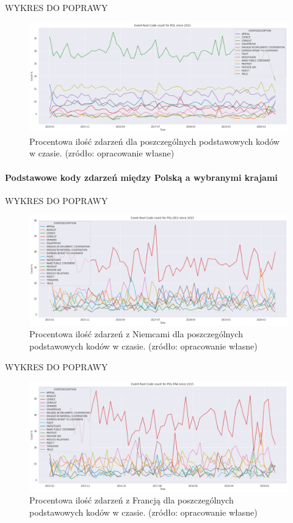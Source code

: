 \documentclass[11pt]{report}
\begin{document}
    WYKRES DO POPRAWY
    \begin{figure}[ht]
        \centering
        \includegraphics[width=1 \textwidth]{fig/PL/PLERCpercinTIME.png}
        \caption{Procentowa ilość zdarzeń dla poszczególnych podstawowych kodów w czasie. (zródło: opracowanie własne)}
        \label{fig:PLPERCpercinTIME}
    \end{figure}

    \paragraph{Podstawowe kody zdarzeń między Polską a wybranymi krajami}
    WYKRES DO POPRAWY
    \begin{figure}[ht]
        \centering
        \includegraphics[width=1 \textwidth]{fig/PL/POLDEUERCperc.png}
        \caption{Procentowa ilość zdarzeń z Niemcami dla poszczególnych podstawowych kodów w czasie. (zródło: opracowanie własne)}
        \label{fig:PLDEUERC}
    \end{figure}

    WYKRES DO POPRAWY
    \begin{figure}[ht]
        \centering
        \includegraphics[width=1 \textwidth]{fig/PL/POLFRAERCperc.png}
        \caption{Procentowa ilość zdarzeń z Francją dla poszczególnych podstawowych kodów w czasie. (zródło: opracowanie własne)}
        \label{fig:PLFRAERC}
    \end{figure}
\end{document}
